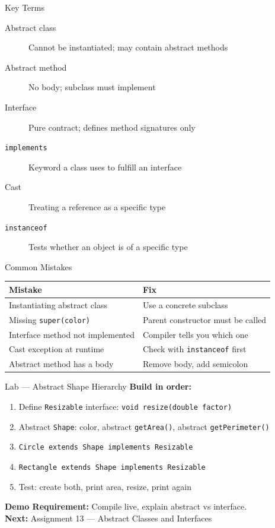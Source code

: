 \documentclass{beamer}
\begin{document}
\begin{frame}{Key Terms}
\begin{description}
  \item[Abstract class] Cannot be instantiated; may contain abstract methods
  \item[Abstract method] No body; subclass must implement
  \item[Interface] Pure contract; defines method signatures only
  \item[\texttt{implements}] Keyword a class uses to fulfill an interface
  \item[Cast] Treating a reference as a specific type
  \item[\texttt{instanceof}] Tests whether an object is of a specific type
\end{description}
\end{frame}
\begin{frame}{Common Mistakes}
\begin{tabular}{ll}
\toprule
\textbf{Mistake} & \textbf{Fix} \\
\midrule
Instantiating abstract class & Use a concrete subclass \\
Missing \texttt{super(color)} & Parent constructor must be called \\
Interface method not implemented & Compiler tells you which one \\
Cast exception at runtime & Check with \texttt{instanceof} first \\
Abstract method has a body & Remove body, add semicolon \\
\bottomrule
\end{tabular}
\end{frame}
\begin{frame}{Lab --- Abstract Shape Hierarchy}
\textbf{Build in order:}
\begin{enumerate}
  \item Define \texttt{Resizable} interface: \texttt{void resize(double factor)}
  \item Abstract \texttt{Shape}: color, abstract \texttt{getArea()}, abstract \texttt{getPerimeter()}
  \item \texttt{Circle extends Shape implements Resizable}
  \item \texttt{Rectangle extends Shape implements Resizable}
  \item Test: create both, print area, resize, print again
\end{enumerate}
\vspace{0.3cm}
\textbf{Demo Requirement:} Compile live, explain abstract vs interface.\\
\vspace{0.3cm}
\textbf{Next:} Assignment 13 --- Abstract Classes and Interfaces
\end{frame}
\end{document}
